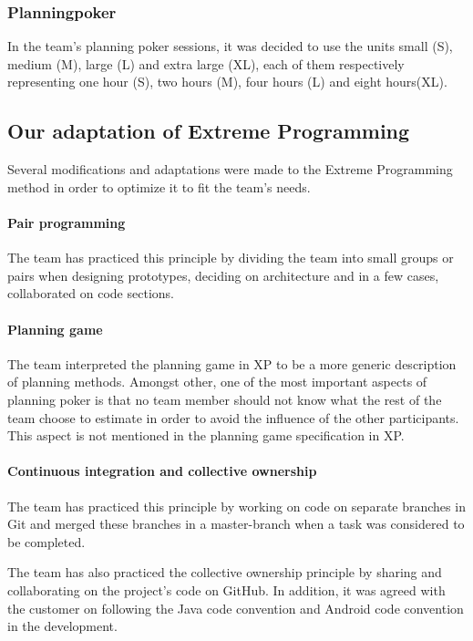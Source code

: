 \subsubsection{Planningpoker}
In the team's planning poker sessions, it was decided to use the units small (S), medium (M), large (L) and extra large (XL), each of them respectively representing one hour (S), two hours (M), four hours (L) and eight hours(XL).


\subsection{Our adaptation of Extreme Programming}
Several modifications and adaptations were made to the Extreme Programming method in order to optimize it to fit the team's needs.

\paragraph{Pair programming}
The team has practiced this principle by dividing the team into small groups or pairs when designing prototypes, deciding on architecture and in a few cases, collaborated on code sections.

\paragraph{Planning game}
The team interpreted the planning game in XP to be a more generic description of planning methods.  Amongst other, one of the most important aspects of planning poker is that no team member should not know what the rest of the team choose to estimate in order to avoid the influence of the other participants. This aspect is not mentioned in the planning game specification in XP.

\paragraph{Continuous integration and collective ownership}
The team has practiced this principle by working on code on separate branches in Git and merged these branches in a master-branch when a task was considered to be completed.

The team has also practiced the collective ownership principle by sharing and collaborating on the project's code on GitHub. In addition, it was agreed with the customer on following the Java code convention and Android code convention in the development.

